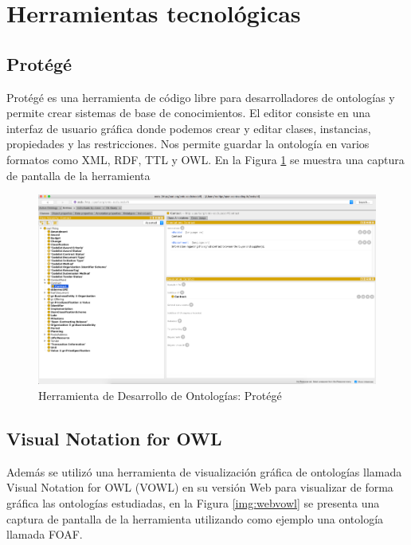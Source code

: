 \section{Herramientas tecnológicas}
\subsection{Protégé}
Protégé es una herramienta de código libre para desarrolladores de ontologías y permite crear sistemas de base de conocimientos. El editor consiste en una interfaz de usuario gráfica donde podemos crear y editar clases, instancias, propiedades y las restricciones. Nos permite guardar la ontología en varios formatos como XML, RDF, TTL y OWL. En la Figura \ref{img:protege} se muestra una captura de pantalla de la herramienta

\begin{figure}[h!]
    \centering
    \includegraphics[width=150mm]{figuras/protege}
    \caption{Herramienta de Desarrollo de Ontologías: Protégé}
    \label{img:protege}
    \end{figure}

\subsection{Visual Notation for OWL}
Además se utilizó una herramienta de visualización gráfica de ontologías llamada Visual Notation for OWL (VOWL) en su versión Web para visualizar de forma gráfica las ontologías estudiadas, en la Figura \ref{img:webvowl} se presenta una captura de pantalla de la herramienta utilizando como ejemplo una ontología llamada FOAF.

